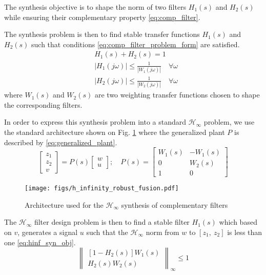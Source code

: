 \documentclass[letterpaper, 10 pt, conference]{ieeeconf}
\begin{document}
The synthesis objective is to shape the norm of two filters \(H_1(s)\) and \(H_2(s)\) while ensuring their complementary property \eqref{eq:comp_filter}.

The synthesis problem is then to find stable transfer functions \(H_1(s)\) and \(H_2(s)\) such that conditions \eqref{eq:comp_filter_problem_form} are satisfied.
\begin{subequations}
\label{eq:comp_filter_problem_form}
  \begin{align}
  & H_1(s) + H_2(s) = 1 \label{eq:hinf_cond_complementarity} \\
  & |H_1(j\omega)| \le \frac{1}{|W_1(j\omega)|} \quad \forall\omega \label{eq:hinf_cond_h1} \\
  & |H_2(j\omega)| \le \frac{1}{|W_2(j\omega)|} \quad \forall\omega \label{eq:hinf_cond_h2}
  \end{align}
\end{subequations}
where \(W_1(s)\) and \(W_2(s)\) are two weighting transfer functions chosen to shape the corresponding filters.

In order to express this synthesis problem into a standard \(\mathcal{H}_\infty\) problem, we use the standard architecture shown on Fig. \ref{fig:h_infinity_robust_fusion} where the generalized plant \(P\) is described by \eqref{eq:generalized_plant}.
\begin{equation}
\label{eq:generalized_plant}
  \begin{bmatrix} z_1 \\ z_2 \\ v \end{bmatrix} = P(s) \begin{bmatrix} w\\u \end{bmatrix}; \quad P(s) = \begin{bmatrix}W_1(s) & -W_1(s) \\ 0 & W_2(s) \\  1 & 0 \end{bmatrix}
\end{equation}

\begin{figure}[htbp]
\centering
\texttt{[image: figs/h\_infinity\_robust\_fusion.pdf]}
\caption{\label{fig:h_infinity_robust_fusion}
Architecture used for the \(\mathcal{H}_\infty\) synthesis of complementary filters}
\end{figure}

The \(\mathcal{H}_\infty\) filter design problem is then to find a stable filter \(H_1(s)\) which based on \(v\), generates a signal \(u\) such that the \(\mathcal{H}_\infty\) norm from \(w\) to \([z_1, \ z_2]\) is less than one \eqref{eq:hinf_syn_obj}.
\begin{equation}
\label{eq:hinf_syn_obj}
  \left\|\begin{matrix} \left[1 - H_2(s)\right] W_1(s) \\ H_2(s) W_2(s) \end{matrix}\right\|_\infty \le 1
\end{equation}
\end{document}
